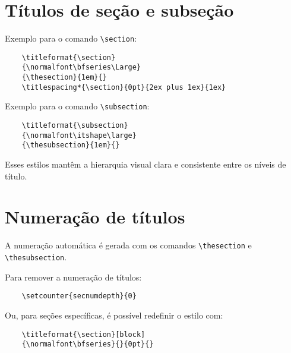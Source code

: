 \section{Títulos de seção e subseção}

Exemplo para o comando \verb|\section|:

\begin{verbatim}
	\titleformat{\section}
	{\normalfont\bfseries\Large}
	{\thesection}{1em}{}
	\titlespacing*{\section}{0pt}{2ex plus 1ex}{1ex}
\end{verbatim}

Exemplo para o comando \verb|\subsection|:

\begin{verbatim}
	\titleformat{\subsection}
	{\normalfont\itshape\large}
	{\thesubsection}{1em}{}
\end{verbatim}

Esses estilos mantêm a hierarquia visual clara e consistente entre os níveis de título.

\section{Numeração de títulos}

A numeração automática é gerada com os comandos \verb|\thesection| e \verb|\thesubsection|.

Para remover a numeração de títulos:

\begin{verbatim}
	\setcounter{secnumdepth}{0}
\end{verbatim}

Ou, para seções específicas, é possível redefinir o estilo com:

\begin{verbatim}
	\titleformat{\section}[block]
	{\normalfont\bfseries}{}{0pt}{}
\end{verbatim}


